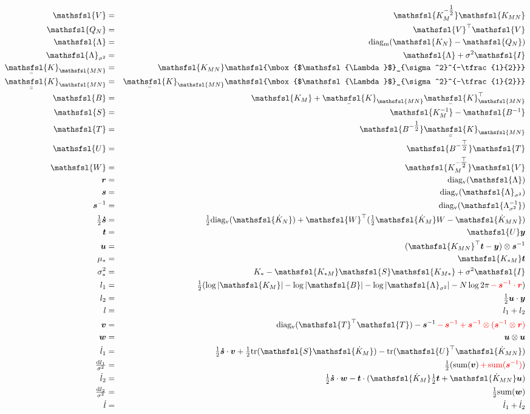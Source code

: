 \documentclass[12pt]{article}
\newcommand{\red}{\textcolor{red}}
\newcommand{\dif}{\mathrm{d}}
\newcommand{\myu}[1]{\underaccent{\bar}{#1}}
\newcommand{\onehalf}{\tfrac{1}{2}}
\newcommand{\mat}[1]{\mbox{$\mathsfsl{#1}$}}
\newcommand{\myvec}[1]{\mbox{\boldmath$#1$}}
\newcommand{\diagv}[1]{\mathrm{diag_v}(#1)}
\newcommand{\diagm}[1]{\mathrm{diag_m}(#1)}
\newcommand{\trace}[1]{\mathrm{tr}(#1)}
\newcommand{\transm}[1]{\mat{#1}^\top}
\newcommand{\imat}[1]{\mat{#1^{-1}}}
\newcommand{\ichol}[1]{\mat{#1^{-\onehalf}}}
\newcommand{\icholt}[1]{\mat{#1^{-\tfrac{\top}{2}}}}
\newcommand{\Km}{\mat{K_M}}
\newcommand{\dKm}{\mat{\dot{K}_M}}
\newcommand{\dkn}{\mat{\dot{K}_N}}
\newcommand{\Kmn}{\mat{K_{MN}}}
\newcommand{\Knm}{\transm{K_{MN}}}
\newcommand{\uKnm}{\myu{\mat{K}}_{\mathsfsl{MN}}^\top}
\newcommand{\dKmn}{\mat{\dot{K}_{MN}}}
\newcommand{\uKmn}{\myu{\mat{K}}_{\mathsfsl{MN}}}
\newcommand{\uuKmn}{\myu{\myu{\mat{K}}}_{\mathsfsl{MN}}}
\newcommand{\dl}{\dot{l}}
\newcommand{\vecr}{\myvec{r}}
\newcommand{\vecs}{\myvec{s}}
\newcommand{\vect}{\myvec{t}}
\newcommand{\vecv}{\myvec{v}}
\newcommand{\vecu}{\myvec{u}}
\newcommand{\vecw}{\myvec{w}}
\newcommand{\vecy}{\myvec{y}}
\newcommand{\vecsdh}{\onehalf\myvec{\dot{s}}}
\newcommand{\vecis}{\myvec{s}^{-1}}
\newcommand{\matB}{\mat{B}}
\newcommand{\matI}{\mat{I}}
\newcommand{\matS}{\mat{S}}
\newcommand{\matT}{\mat{T}}
\newcommand{\matU}{\mat{U}}
\newcommand{\matV}{\mat{V}}
\newcommand{\matW}{\mat{W}}
\newcommand{\Lam}{\mat{\Lambda}}
\newcommand{\Lamss}{\mat{\Lambda}_{\sigma^2}}
\newcommand{\Lamssi}{\imat{\Lambda_{\sigma^2}}}
\begin{document}
\begin{eqnarray*}
\matV & = & \ichol{K_M}\Kmn \\
\mat{Q_N} & = & \transm{V} \matV \\
\Lam & = & \diagm{\mat{K_N} - \mat{Q_N}} \\
\Lamss & = & \Lam + \sigma^2 \matI \\
\uKmn & = & \Kmn \ichol{\Lamss} \\
\uuKmn & = & \uKmn\ichol{\Lamss} \\
\matB & = & \Km + \uKmn\uKnm \\
\matS & = & \imat{K_M} - \imat{B} \\
\matT & = & \ichol{B}\uuKmn \\
\matU & = & \icholt{B}\matT \\
\matW & = & \icholt{K_M}\mat{V} \\
\vecr & = & \diagv{\Lam} \\
\vecs & = & \diagv{\Lamss} \\
\vecis & = & \diagv{\Lamssi} \\
\vecsdh & = & \onehalf\diagv{\dkn} + \transm{W}(\onehalf\dKm W - \dKmn) \\
\vect & = & \matU \vecy \\
\vecu & = & (\Knm \vect - \vecy) \otimes \vecis \\
\mu_* & = & \mat{K_{*M}} \vect \\
\sigma^2_* & = & K_* - \mat{K_{*M}}\matS\mat{K_{M*}} + \sigma^2 \matI \\
l_1 & = & \onehalf (\log|\Km| - \log|\matB| - \log|\Lamss| - N \log 2\pi \red{\, - \, \vecis \cdot \vecr}) \\
l_2 & = & \onehalf \vecu\cdot\vecy \\
l & = & l_1 + l_2 \\
\vecv & = & \diagv{\transm{T}\matT} - \vecis \red{\, - \, \vecis + \vecis\otimes(\vecis \otimes \vecr)} \\
\vecw & = & \vecu \otimes \vecu \\
\dl_1 & = & \vecsdh\cdot\vecv + \onehalf\trace{\matS\dKm} - \trace{\transm{U}\dKmn} \\
\tfrac{\dif l_1}{\sigma^2} & = & \onehalf (\mathrm{sum}(\vecv) \red {\, + \, \mathrm{sum}(\vecis)}) \\
\dl_2 & = & \vecsdh\cdot\vecw - \vect\cdot(\dKm \onehalf \vect + \dKmn \vecu) \\
\tfrac{\dif l_2}{\sigma^2} & = & \onehalf \mathrm{sum}(\vecw) \\
\dl & = & \dl_1 + \dl_2 \\
\end{eqnarray*}
\end{document}
